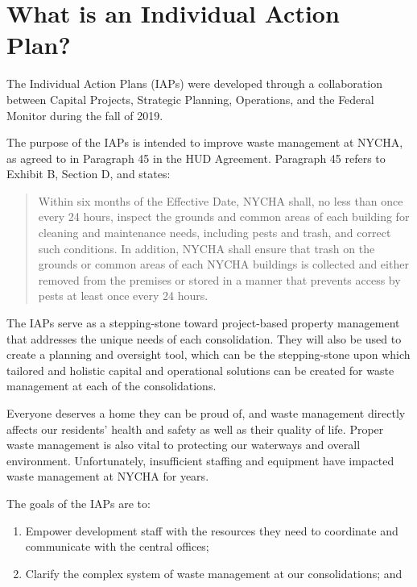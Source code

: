    {\selectfont
    \section{What is an Individual Action Plan?}

The Individual Action Plans (IAPs) were developed through a collaboration between Capital Projects, Strategic Planning, Operations, and the Federal Monitor during the fall of 2019. 

The purpose of the IAPs is intended to improve waste management at NYCHA, as agreed to in Paragraph 45 in the HUD Agreement. Paragraph 45 refers to Exhibit B, Section D, and states:

\begin{quote}

Within six months of the Effective Date, NYCHA shall, no less than once every 24 hours, inspect the grounds and common areas of each building for cleaning and maintenance needs, including pests and trash, and correct such conditions. In addition, NYCHA shall ensure that trash on the grounds or common areas of each NYCHA buildings is collected and either removed from the premises or stored in a manner that prevents access by pests at least once every 24 hours.

\end{quote}

The  IAPs serve as a stepping-stone toward project-based property management that addresses the unique needs of each consolidation. They will also be used to create a planning and oversight tool, which can be the stepping-stone upon which tailored and holistic capital and operational solutions can be created for waste management at each of the consolidations.

Everyone deserves a home they can be proud of, and waste management directly affects our residents' health and safety as well as their quality of life. Proper waste management is also vital to protecting our waterways and overall environment. Unfortunately, insufficient staffing and equipment have impacted waste management at NYCHA for years. 

The goals of the IAPs are to: 

\begin{enumerate}[noitemsep]

\item Empower development staff with the resources they need to coordinate and communicate with the central offices;

\item Clarify the complex system of waste management at our consolidations; and


\end{enumerate}}
